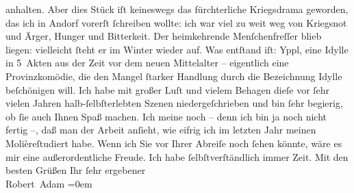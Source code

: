 \begin{ledgroupsized}[t]{13cm}
               anhalten. Aber dies Stück iſt keineswegs das fürchterliche Kriegsdrama geworden, das ich in Andorf vorerſt ſchreiben wollte: ich war viel zu
               weit weg von Kriegsnot und Ärger, Hunger und Bitterkeit. Der heimkehrende
               Menſchenfreſſer blieb liegen: vielleicht ſteht er im Winter wieder auf. Was entſtand
               iſt: Yppl, eine Idylle in 5 Akten aus der Zeit
               vor dem neuen Mittelalter – eigentlich eine Provinzkomödie, die den Mangel ſtarker
               Handlung durch die Bezeichnung Idylle beſchönigen will. Ich habe mit großer Luſt und
               vielem Behagen dieſe vor ſehr vielen Jahren halb-ſelbſterlebten Szenen
               niedergeſchrieben und bin ſehr begierig, ob ſie auch Ihnen Spaß machen. Ich meine
               noch – denn ich bin ja noch nicht fertig –, daß man der Arbeit anſieht, wie eifrig
               ich im letzten Jahr meinen Molièreſtudiert habe.\pend
           \pstart
           {\pb}Wenn ich Sie vor Ihrer Abreiſe noch ſehen
               könnte, wäre es mir \introOben{}eine\introOben{} außerordentliche Freude. Ich habe
               ſelbſtverſtändlich immer Zeit.\pend
           \pstart
           Mit den besten Grüßen Ihr ſehr ergebener{\\[\baselineskip]}\spacefill\mbox{Robert Adam}\pend
           \leftskip=0em{}
         
         \endnumbering{}\end{ledgroupsized}  \newcommand{\dateiname}{L02291}\newcommand{\titel}{Robert Adam an Arthur Schnitzler, 29. 7. 1918}\newcommand{\editorInnen}{Martin Anton Müller und Gerd-Hermann Susen}
      